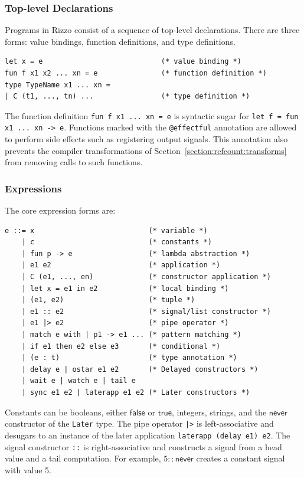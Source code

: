 \subsubsection{Top-level Declarations}

Programs in Rizzo consist of a sequence of top-level declarations. There are three forms: value bindings, function definitions, and type definitions.

\begin{verbatim}
let x = e                            (* value binding *)
fun f x1 x2 ... xn = e               (* function definition *)
type TypeName x1 ... xn = 
| C (t1, ..., tn) ...                (* type definition *)
\end{verbatim}

The function definition \texttt{fun f x1 ... xn = e} is syntactic sugar for \texttt{let f = fun x1 ... xn -> e}. Functions marked with the \texttt{@effectful} annotation are allowed to perform side effects such as registering output signals. This annotation also prevents the compiler transformations of Section~\ref{section:refcount:transforms} from removing calls to such functions.

\subsubsection{Expressions}

The core expression forms are:

\begin{verbatim}
e ::= x                           (* variable *)
    | c                           (* constants *)
    | fun p -> e                  (* lambda abstraction *)
    | e1 e2                       (* application *)
    | C (e1, ..., en)             (* constructor application *)
    | let x = e1 in e2            (* local binding *)
    | (e1, e2)                    (* tuple *)
    | e1 :: e2                    (* signal/list constructor *)
    | e1 |> e2                    (* pipe operator *)
    | match e with | p1 -> e1 ... (* pattern matching *)
    | if e1 then e2 else e3       (* conditional *)
    | (e : t)                     (* type annotation *)
    | delay e | ostar e1 e2       (* Delayed constructors *)
    | wait e | watch e | tail e 
    | sync e1 e2 | laterapp e1 e2 (* Later constructors *) 
\end{verbatim}

Constants can be booleans, either $\mathsf{false}$ or $\mathsf{true}$, integers, strings, and the $\mathsf{never}$ constructor of the \texttt{Later} type.
The pipe operator \texttt{|>} is left-associative and desugars to an instance of the later application \verb|laterapp (delay e1) e2|.
The signal constructor \texttt{::} is right-associative and constructs a signal from a head value and a tail computation. For example, $5 :: \mathsf{never}$ creates a constant signal with value 5.

